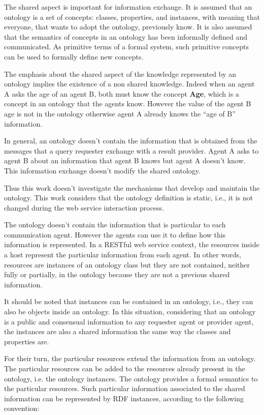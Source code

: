 \documentclass{singlecol-new}
\theoremstyle{TH}{
\newtheorem{lemma}{Lemma}
\newtheorem{theorem}[lemma]{Theorem}
\newtheorem{corrolary}[lemma]{Corrolary}
\newtheorem{conjecture}[lemma]{Conjecture}
\newtheorem{proposition}[lemma]{Proposition}
\newtheorem{claim}[lemma]{Claim}
\newtheorem{stheorem}[lemma]{Wrong Theorem}
\newtheorem{algorithm}{Algorithm}
}
\theoremstyle{THrm}{
\newtheorem{definition}{Definition}[section]
\newtheorem{question}{Question}[section]
\newtheorem{remark}{Remark}
\newtheorem{scheme}{Scheme}
}
\theoremstyle{THhit}{
\newtheorem{case}{Case}[section]
}
\begin{document}
The shared aspect is important for information exchange. 
It is assumed that an ontology is a set of concepts: classes, properties, and instances, with meaning that everyone, that wants to adopt the ontology, previously know.
It is also assumed that the semantics of concepts in an ontology has been informally defined and communicated. As primitive terms of a formal system, such primitive concepts can be used to formally define new concepts.

The emphasis about the shared aspect of the knowledge represented by an ontology implies the existence of a non shared knowledge. 
Indeed when an agent A asks the age of an agent B, both must know the concept \textbf{Age}, which is a concept in an ontology that the agents know.
However the value of the agent B age is not in the ontology otherwise agent A already knows the ``age of B'' information. 

In general, an ontology doesn't contain the information that is obtained from the messages that a query requester exchange with a result provider.
Agent A asks to agent B about an information that agent B knows but agent A doesn't know.
This information exchange doesn't modify the shared ontology. 

Thus this work doesn't investigate the mechanisms that develop and maintain the ontology. This work considers that the ontology definition is static, i.e., it is not changed during the web service interaction process.

The ontology doesn't contain the information that is particular to each communication agent. 
However the agents can use it to define how this information is represented.
In a RESTful web service context, the resources inside a host represent the particular information from each agent. 
In other words, resources are instances of an ontology class but they are not contained, neither fully or partially, in the ontology because they are not a previous shared information. 

It should be noted that instances can be contained in an ontology, i.e., they can also be objects inside an ontology. 
In this situation, considering that an ontology is a public and consensual information to any requester agent or provider agent, the instances are also a shared information the same way the classes and properties are.  

For their turn, the particular resources extend the information from an ontology. 
The particular resources can be added to the resources already present in the ontology, i.e. the ontology instances. 
The ontology provides a formal semantics to the particular resources. 
Such particular information associated to the shared information can be represented by RDF instances, according to the following convention:
\end{document}

